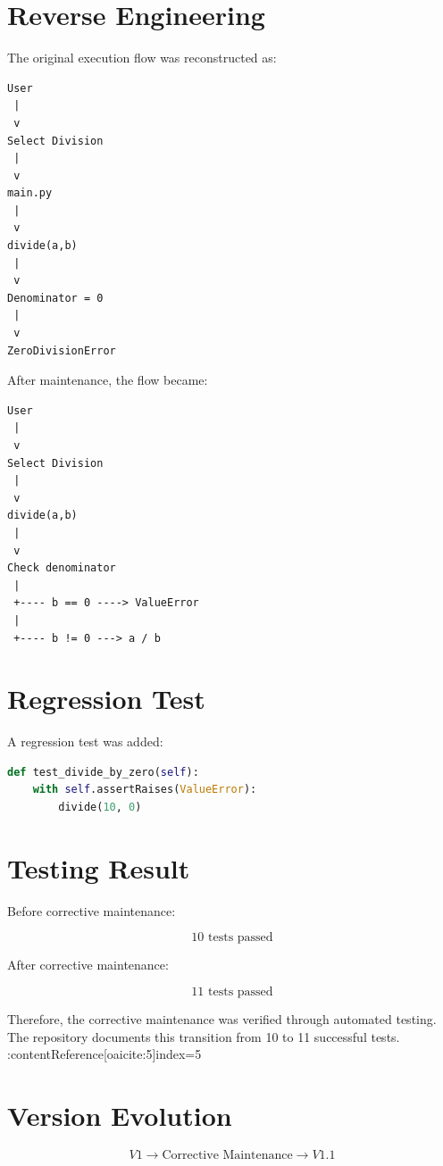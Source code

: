 \documentclass[12pt,a4paper]{report}
\begin{document}
\section{Reverse Engineering}

The original execution flow was reconstructed as:

\begin{lstlisting}
User
 |
 v
Select Division
 |
 v
main.py
 |
 v
divide(a,b)
 |
 v
Denominator = 0
 |
 v
ZeroDivisionError
\end{lstlisting}

After maintenance, the flow became:

\begin{lstlisting}
User
 |
 v
Select Division
 |
 v
divide(a,b)
 |
 v
Check denominator
 |
 +---- b == 0 ----> ValueError
 |
 +---- b != 0 ---> a / b
\end{lstlisting}

\section{Regression Test}

A regression test was added:

\begin{lstlisting}[language=Python]
def test_divide_by_zero(self):
    with self.assertRaises(ValueError):
        divide(10, 0)
\end{lstlisting}

\section{Testing Result}

Before corrective maintenance:

\[
10\text{ tests passed}
\]

After corrective maintenance:

\[
11\text{ tests passed}
\]

Therefore, the corrective maintenance was verified through automated
testing. The repository documents this transition from 10 to 11
successful tests. :contentReference[oaicite:5]{index=5}

\section{Version Evolution}

\[
V1
\rightarrow
\text{Corrective Maintenance}
\rightarrow
V1.1
\]

\end{document}
